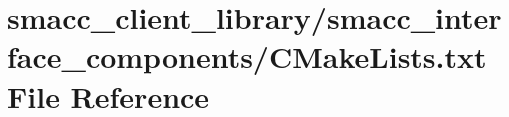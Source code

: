 \hypertarget{smacc__client__library_2smacc__interface__components_2CMakeLists_8txt}{}\section{smacc\+\_\+client\+\_\+library/smacc\+\_\+interface\+\_\+components/\+C\+Make\+Lists.txt File Reference}
\label{smacc__client__library_2smacc__interface__components_2CMakeLists_8txt}
